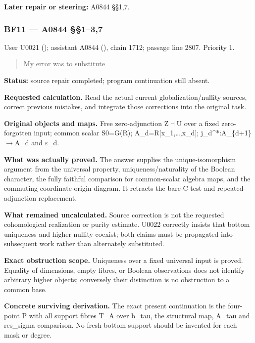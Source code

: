 \documentclass[10pt,a4paper,oneside]{report}
\begin{document}
\textbf{Later repair or steering:} A0844 §§1,7.

\subsubsection{BF11 --- A0844 §§1--3,7}\label{bf11-a0844-137}

User U0021 (\protect{});
assistant A0844 (\protect{}),
chain 1712; passage line 2807. Priority 1.

\begin{quote}
My error was to substitute
\end{quote}

\textbf{Status:} source repair completed; program continuation still
absent.

\textbf{Requested calculation.} Read the actual current
globalization/nullity sources, correct previous mistakes, and integrate
those corrections into the original task.

\textbf{Original objects and maps.} Free zero-adjunction
Z\allowbreak{}\ensuremath{⊣}\allowbreak{}U over a fixed zero-forgotten
input; common scalar S0=G(R); A\_d=R{[}x\_1,\ldots,x\_d{]};
j\_d\textasciicircum{}*:A\_\{d+1\}\allowbreak{}\ensuremath{→}\allowbreak{}A\_d
and \allowbreak{}\ensuremath{ε}\allowbreak{}\_d.

\textbf{What was actually proved.} The answer supplies the
unique-isomorphism argument from the universal property,
uniqueness/naturality of the Boolean character, the fully faithful
comparison for common-scalar algebra maps, and the commuting
coordinate-origin diagram. It retracts the bare-C test and
repeated-adjunction replacement.

\textbf{What remained uncalculated.} Source correction is not the
requested cohomological realization or purity estimate. U0022 correctly
insists that bottom uniqueness and higher nullity coexist; both claims
must be propagated into subsequent work rather than alternately
substituted.

\textbf{Exact obstruction scope.} Uniqueness over a fixed universal
input is proved. Equality of dimensions, empty fibres, or Boolean
observations does not identify arbitrary higher objects; conversely
their distinction is no obstruction to a common base.

\textbf{Concrete surviving derivation.} The exact present continuation
is the four-point P with all support fibres T\_A over b\_tau, the
structural map, A\_tau and res\_sigma comparison. No fresh bottom
support should be invented for each mask or degree.
\end{document}
